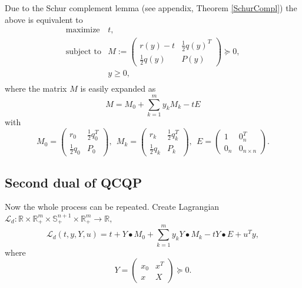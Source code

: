 \documentclass[12pt]{book}
\theoremstyle{definition}
\begin{document}
Due to the Schur complement lemma (see appendix, Theorem \ref{SchurCompl}) the above is equivalent to
\begin{equation}
\begin{array}{ll}
\mbox{maximize} & t, \\
\mbox{subject to}& M:=\left(\begin{array}{ll}
r(y)-t & \frac{1}{2}q(y)^T \\
\frac{1}{2}q(y) & P(y)
\end{array}\right)\succeq 0,
 \\
&y \geq 0,\\
\end{array} 
\end{equation}
where the matrix $M$ is easily expanded as 
\begin{equation}
M= M_0 + \sum_{k=1}^m y_kM_k  - tE
\end{equation}
with
\begin{equation}
M_0 = \left(\begin{array}{rr} r_0& \frac{1}{2}q_0^T\\ \frac{1}{2}q_0 & P_0 \end{array}\right) , \ \ 
M_k = \left(\begin{array}{ll} r_k & \frac{1}{2}q_k^T\\ \frac{1}{2}q_k & P_k \end{array}\right), \ \ 
E =  \left(\begin{array}{ll} 1 & 0_n^T\\ 0_n & 0_{n\times n} \end{array}\right). 
\end{equation}

\subsection{Second dual of QCQP}

Now the whole process can be repeated. Create Lagrangian 
$\mathcal{L}_d: \mathbb{R}\times\mathbb{R}^m_+\times\mathbb{S}^{n+1}_+\times\mathbb{R}^m_+ \rightarrow \mathbb{R},$
\begin{equation}
\mathcal{L}_d(t,y,Y,u) = t + Y\bullet M_0 + \sum_{k=1}^m y_kY\bullet M_k - tY\bullet E  + u^Ty,
\end{equation}
where
\begin{equation}
Y = \left(\begin{array}{ll}
x_0 & x^T \\
x & X
\end{array}\right)\succeq 0.
\end{equation}
\end{document}
